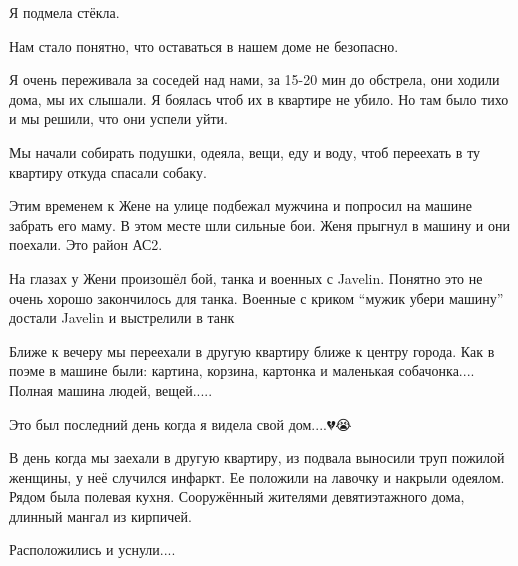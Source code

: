 Я подмела стёкла.

Нам стало понятно, что оставаться в нашем доме не безопасно. 

Я очень переживала за соседей над нами, за 15-20 мин до обстрела, они ходили
дома, мы их слышали. Я боялась чтоб их в квартире не убило. Но там было тихо и
мы решили, что они успели уйти. 

Мы начали собирать подушки, одеяла, вещи, еду и воду, чтоб переехать в ту
квартиру откуда спасали собаку. 

Этим временем к Жене на улице подбежал мужчина и попросил на машине забрать его
маму. В этом месте шли сильные бои. Женя прыгнул в машину и они поехали. Это
район АС2. 

На глазах у Жени произошёл бой, танка и военных с Javelin. Понятно это не очень
хорошо закончилось для танка. Военные с криком \enquote{мужик убери машину} достали
Javelin и выстрелили в танк

Ближе к вечеру мы переехали в другую квартиру ближе к центру города. Как в
поэме в машине были: картина, корзина, картонка и маленькая собачонка....  Полная
машина людей, вещей.....

Это был последний день когда я видела свой дом....💔😭

В день когда мы заехали в другую квартиру, из подвала выносили труп пожилой
женщины, у неё случился инфаркт. Ее положили на лавочку и накрыли одеялом.
Рядом была полевая кухня. Сооружённый жителями девятиэтажного дома, длинный
мангал из кирпичей. 

Расположились и уснули....


